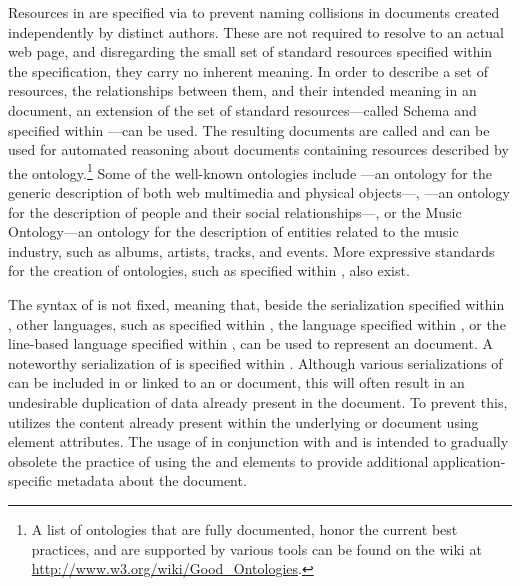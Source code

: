 \documentclass{book}
\begin{document}
Resources in  are specified via  to prevent naming
collisions in  documents created independently by distinct authors.
These  are not required to resolve to an actual web page, and
disregarding the small set of standard resources specified within the
 specification, they carry no inherent meaning. In order to
describe a set of resources, the relationships between them, and their intended
meaning in an  document, an extension of the set of standard
resources---called  Schema and specified within
\cite{brickley04}---can be used. The resulting documents are called
  and can be used for automated
reasoning about  documents containing resources described by the
ontology.\footnote{
  A list of ontologies that are fully documented, honor the current best
  practices, and are supported by various tools can be found on the
   wiki at \url{http://www.w3.org/wiki/Good_Ontologies}.
} Some of the well-known ontologies include ---an ontology for the
generic description of both web multimedia and physical objects---,
---an ontology for the description of people and their social
relationships---, or the Music Ontology---an ontology for the description of
entities related to the music industry, such as albums, artists, tracks, and
events. More expressive standards for the creation of ontologies, such as
 specified within \cite{mcguinness04}, also exist.

The syntax of  is not fixed, meaning that, beside the
 serialization specified within \cite{lassira99}, other
languages, such as  specified within \cite{sporny14}, the
 language specified within \cite{beckett14:turtle}, or the
line-based  language specified within \cite{beckett14:nt}, can be
used to represent an  document. A noteworthy serialization of
 is  specified within \cite{adida08}. Although
various serializations of  can be included in or linked to an
 or  document, this will often result in an
undesirable duplication of data already present in the document. To prevent
this,  utilizes the content already present within the underlying
 or  document using element attributes. The
usage of  in conjunction with  and  is
intended to gradually obsolete the practice of using the  and
 elements to provide additional application-specific metadata about
the document.
\end{document}
